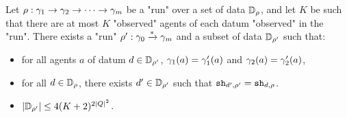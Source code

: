 \begin{lemma}
	\label{lem:data-core-lemma}
	Let $\rho : \gamma_1 \to \gamma_2 \to \cdots \to \gamma_m$ be a "run"  over a set of data $\mathbb{D}_{\rho}$, and let $K$ be such that there are at most $K$ "observed" agents of each datum "observed" in the "run". There exists a "run" $\rho' : \gamma_0 \xrightarrow{*} \gamma_m$ and a subset of data $\mathbb{D}_{\rho'}$ such that:
	\begin{itemize}
		\item for all agents $a$ of datum $d \in \mathbb{D}_{\rho'}$, $\gamma_1(a) = \gamma'_1(a)$ and $\gamma_2(a) = \gamma'_2(a)$,
		
		\item for all $d \in \mathbb{D}_{\rho}$, there exists $d' \in \mathbb{D}_{\rho'}$ such that $\mathtt{sh}_{d',\rho'} = \mathtt{sh}_{d,\rho}$.
		
		\item $|\mathbb{D}_{\rho'}| \leq 4(K+2)^{2|Q|^2}$.
	\end{itemize}
\end{lemma}


